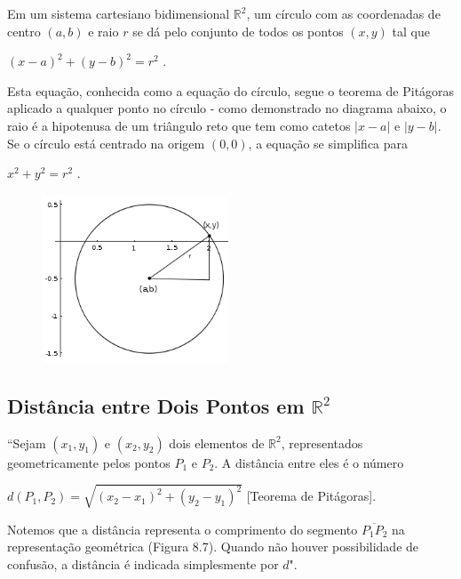 		Em um sistema cartesiano bidimensional $\mathbb{R}^{2}$, um círculo com as coordenadas de centro $(a, b)$ e raio $r$ se dá pelo conjunto de todos os pontos $(x, y)$ tal que

		\bigskip

		{\LARGE $(x - a)^{2} + (y - b)^{2} = r^{2}$} .

		\bigskip

		Esta equação, conhecida como a equação do círculo, segue o teorema de Pitágoras aplicado a qualquer ponto no círculo - como demonstrado no diagrama abaixo, o raio é a hipotenusa de um triângulo reto que tem como catetos $|x - a|$ e $|y - b|$. Se o círculo está centrado na origem $(0, 0)$, a equação se simplifica para

		\bigskip

		{\LARGE $x^{2} + y^{2} = r^{2}$} .

		\begin{figure}[H]
			\includegraphics[height=5cm]{images/wikipedia_circle-equation}
		\end{figure}
		
	\subsection{Distância entre Dois Pontos em $\mathbb{R}^{2}$ \cite{morettin}}

		``Sejam $(x_{1}, y_{1})$ e $(x_{2}, y_{2})$ dois elementos de $\mathbb{R}^{2}$, representados geometricamente pelos pontos $P_{1}$ e $P_{2}$. A distância entre eles é o número

		\bigskip

		{\LARGE $d(P_{1}, P_{2}) = \sqrt{(x_{2} - x_{1})^{2} + (y_{2} - y_{1})^{2}}$} [Teorema de Pitágoras].

		\bigskip

		Notemos que a distância representa o comprimento do segmento $\overline{P_{1}P_{2}}$ na representação geométrica (Figura 8.7). Quando não houver possibilidade de confusão, a distância é indicada simplesmente por $d$".

